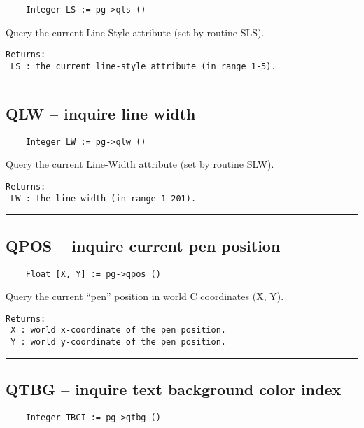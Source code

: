 \begin{verbatim}
    Integer LS := pg->qls ()
\end{verbatim}

Query the current Line Style attribute (set by routine SLS).

\begin{verbatim}
Returns:
 LS : the current line-style attribute (in range 1-5).
\end{verbatim}

\hrule

\subsection*{QLW -- inquire line width }

\begin{verbatim}
    Integer LW := pg->qlw ()
\end{verbatim}

Query the current Line-Width attribute (set by routine SLW).

\begin{verbatim}
Returns:
 LW : the line-width (in range 1-201).
\end{verbatim}

\hrule

\subsection*{QPOS -- inquire current pen position }

\begin{verbatim}
    Float [X, Y] := pg->qpos ()
\end{verbatim}

Query the current ``pen'' position in world C coordinates (X, Y).

\begin{verbatim}
Returns:
 X : world x-coordinate of the pen position.
 Y : world y-coordinate of the pen position.
\end{verbatim}

\hrule

\subsection*{QTBG -- inquire text background color index }

\begin{verbatim}
    Integer TBCI := pg->qtbg ()
\end{verbatim}


